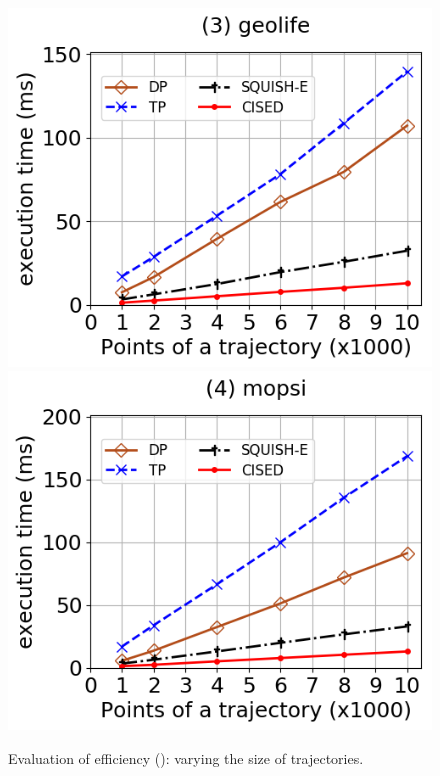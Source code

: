 \begin{figure}[tb!]
	\includegraphics[scale=0.315]{Figures/Exp-SED-time-size-geolife.png}	\hspace{1ex}
	\includegraphics[scale=0.315]{Figures/Exp-SED-time-size-mopsi.png}	\hspace{1ex}
	\vspace{-2.5ex}
	\caption{\small Evaluation of efficiency (\sed): varying the size of trajectories.}\label{fig:time-size-sed}
	\vspace{-3ex}
\end{figure}

